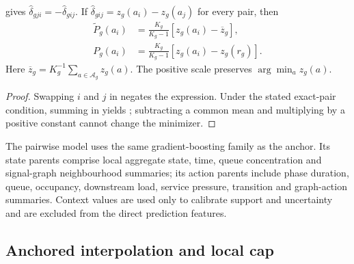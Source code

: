 \begin{proposition}
\label{prop:pairwise-recovery}
 gives
$\widehat\delta_{gji}=-\widehat\delta_{gij}$.  If
$\widehat\delta_{gij}=z_g(a_i)-z_g(a_j)$ for every pair, then
\begin{equation}
\begin{aligned}
 \widetilde P_g(a_i)&=\frac{K_g}{K_g-1}
 \left[z_g(a_i)-\overline z_g\right],\\
 P_g(a_i)&=\frac{K_g}{K_g-1}
 \left[z_g(a_i)-z_g(r_g)\right].
\end{aligned}
 \label{eq:pairwise-recovery}
\end{equation}
Here $\overline z_g=K_g^{-1}\sum_{a\in\mathcal A_g}z_g(a)$.  The positive
scale preserves $\arg\min_a z_g(a)$.
\end{proposition}
\begin{proof}
Swapping $i$ and $j$ in  negates the expression.  Under
the stated exact-pair condition, summing in  yields
; subtracting a common mean and multiplying by a
positive constant cannot change the minimizer.
\end{proof}

The pairwise model uses the same gradient-boosting family as the anchor.  Its
state parents comprise local aggregate state, time, queue concentration and
signal-graph neighbourhood summaries; its action parents include phase
duration, queue, occupancy, downstream load, service pressure, transition and
graph-action summaries.  Context values are used only to calibrate support and
uncertainty and are excluded from the direct prediction features.

\subsection{Anchored interpolation and local cap}
\label{sec:methods-blend}

